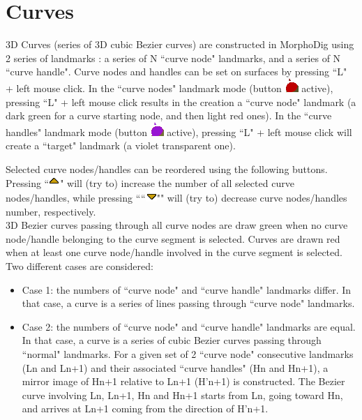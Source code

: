 \section{Curves}\label{file_curve_section}

3D Curves (series of 3D cubic Bezier curves) are constructed in MorphoDig using 2 series of landmarks : a series of N ``curve node" landmarks, and a series of N ``curve handle".  Curve nodes and handles can be set on surfaces by pressing ``L" + left mouse click. In the ``curve nodes" landmark mode (button \includegraphics[scale=0.7]{images/04/curve_nodes.png} active), pressing ``L" + left mouse click results in the creation a ``curve node" landmark (a dark green for a curve starting node, and then light red ones). In the ``curve handles" landmark mode (button \includegraphics[scale=0.7]{images/04/curve_handles.png} active), pressing ``L" + left mouse click will create a ``target" landmark (a violet transparent one).

Selected curve nodes/handles can be reordered using the following buttons. Pressing ``\includegraphics[scale=0.7]{images/06/objects/move_up.png}"
will (try to) increase the number of all selected curve nodes/handles, while pressing ````\includegraphics[scale=0.7]{images/06/objects/move_down.png}""
will (try to) decrease curve nodes/handles number, respectively.\\


3D Bezier curves passing through all curve nodes are draw green when no curve node/handle belonging to
the curve segment is selected. Curves are drawn red when at least one curve node/handle involved in the
curve segment is selected. Two different cases are considered:
\begin{itemize}

\item Case 1: the numbers of ``curve node" and ``curve handle" landmarks differ. In that case, a curve is a series of lines passing through ``curve node" landmarks.
\item Case 2: the numbers of ``curve node" and ``curve handle" landmarks are equal. In that case, a curve is a
series of cubic Bezier curves passing through ``normal" landmarks. For a given set of 2 ``curve node"
consecutive landmarks (Ln and Ln+1) and their associated ``curve handles" (Hn and Hn+1), a mirror
image of Hn+1 relative to Ln+1 (H'n+1) is constructed. The Bezier curve involving Ln, Ln+1, Hn and
Hn+1 starts from Ln, going toward Hn, and arrives at Ln+1 coming from the direction of H'n+1.

\end{itemize}


